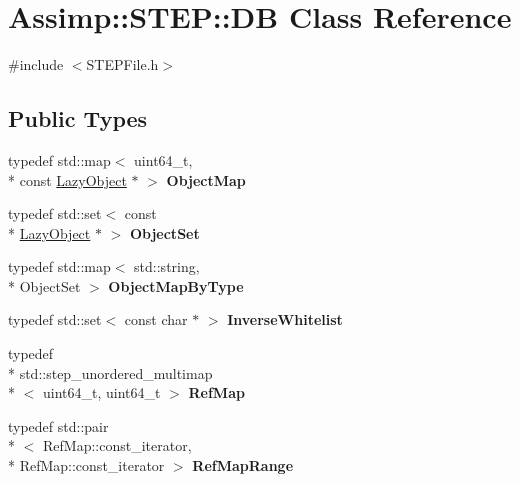 \hypertarget{class_assimp_1_1_s_t_e_p_1_1_d_b}{\section{Assimp\+:\+:S\+T\+E\+P\+:\+:D\+B Class Reference}
\label{class_assimp_1_1_s_t_e_p_1_1_d_b}
}


{\ttfamily \#include $<$S\+T\+E\+P\+File.\+h$>$}

\subsection*{Public Types}
\begin{DoxyCompactItemize}
\item 
\hypertarget{class_assimp_1_1_s_t_e_p_1_1_d_b_a91baa48176429257b08911deee785646}{typedef std\+::map$<$ uint64\+\_\+t, \\*
const \hyperlink{class_assimp_1_1_s_t_e_p_1_1_lazy_object}{Lazy\+Object} $\ast$ $>$ {\bfseries Object\+Map}}\label{class_assimp_1_1_s_t_e_p_1_1_d_b_a91baa48176429257b08911deee785646}

\item 
\hypertarget{class_assimp_1_1_s_t_e_p_1_1_d_b_a156b877e99080c36597f8fd5acfd8e0a}{typedef std\+::set$<$ const \\*
\hyperlink{class_assimp_1_1_s_t_e_p_1_1_lazy_object}{Lazy\+Object} $\ast$ $>$ {\bfseries Object\+Set}}\label{class_assimp_1_1_s_t_e_p_1_1_d_b_a156b877e99080c36597f8fd5acfd8e0a}

\item 
\hypertarget{class_assimp_1_1_s_t_e_p_1_1_d_b_ab61b70425b2450813ef258a3d1511ad2}{typedef std\+::map$<$ std\+::string, \\*
Object\+Set $>$ {\bfseries Object\+Map\+By\+Type}}\label{class_assimp_1_1_s_t_e_p_1_1_d_b_ab61b70425b2450813ef258a3d1511ad2}

\item 
\hypertarget{class_assimp_1_1_s_t_e_p_1_1_d_b_a03c477d560bd3b11a21dc98797491dc8}{typedef std\+::set$<$ const char $\ast$ $>$ {\bfseries Inverse\+Whitelist}}\label{class_assimp_1_1_s_t_e_p_1_1_d_b_a03c477d560bd3b11a21dc98797491dc8}

\item 
\hypertarget{class_assimp_1_1_s_t_e_p_1_1_d_b_ad96bf4572b2f461ed984b8c4cb0a79c7}{typedef \\*
std\+::step\+\_\+unordered\+\_\+multimap\\*
$<$ uint64\+\_\+t, uint64\+\_\+t $>$ {\bfseries Ref\+Map}}\label{class_assimp_1_1_s_t_e_p_1_1_d_b_ad96bf4572b2f461ed984b8c4cb0a79c7}

\item 
\hypertarget{class_assimp_1_1_s_t_e_p_1_1_d_b_acfd909cba5a7c198ddc7c6867c86f6d4}{typedef std\+::pair\\*
$<$ Ref\+Map\+::const\+\_\+iterator, \\*
Ref\+Map\+::const\+\_\+iterator $>$ {\bfseries Ref\+Map\+Range}}\label{class_assimp_1_1_s_t_e_p_1_1_d_b_acfd909cba5a7c198ddc7c6867c86f6d4}

\end{DoxyCompactItemize}
